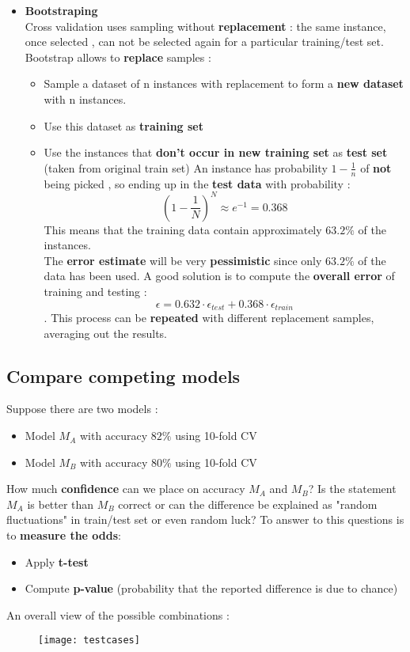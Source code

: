 \begin{itemize}
\item \textbf{Bootstraping}\\
Cross validation uses sampling without \textbf{replacement} :  the same instance, once selected , can not be selected again for a particular training/test set.
Bootstrap allows to \textbf{replace} samples :
\begin{itemize}
\item Sample a dataset of n instances with replacement to form a \textbf{new dataset} with n instances.
\item Use this dataset as \textbf{training set}
\item Use the instances that \textbf{don't occur in new training set} as \textbf{test set} (taken from original train set) 
An instance has probability  $1-\frac{1}{n}$ of \textbf{not} being picked , so ending up in the \textbf{test data} with probability :$$ \left( 1- \frac{1}{N} \right)^N \approx e^{-1} = 0.368$$ This means that the training data contain approximately $ 63.2 \% $ of the instances.\\
The \textbf{error estimate} will be very \textbf{pessimistic} since only $63.2\%$ of the data has been used. A good solution is to compute the \textbf{overall error} of training and testing : $$ \epsilon = 0.632 \cdot \epsilon_{test} + 0.368 \cdot \epsilon_{train}$$.
This process can be \textbf{repeated} with different replacement samples, averaging out the results.
\end{itemize}
\end{itemize}

\subsection{Compare competing models}
Suppose there are two models :
\begin{itemize}
\item Model $M_A$ with accuracy $82 \%$ using 10-fold CV
\item Model $M_B$ with accuracy $80 \%$ using 10-fold CV
\end{itemize}
How much \textbf{confidence} can we place on accuracy $M_A$ and $M_B$?
Is the statement $M_A$ is better than $M_B$ correct or can the difference be explained as "random fluctuations" in train/test set or even random luck?
To answer to this questions is to \textbf{measure the odds}:
\begin{itemize}
\item Apply \textbf{t-test}
\item Compute \textbf{p-value} (probability that the reported difference is due to chance)
\end{itemize}
An overall view of the possible combinations : 
\begin{figure}[H]
  \centering
  \texttt{[image: testcases]}
\end{figure}

